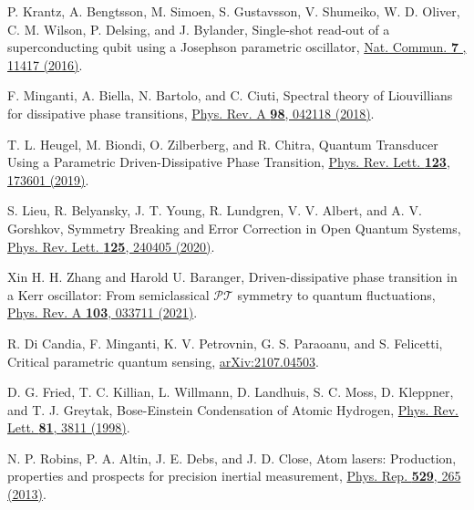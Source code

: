 \documentclass[twocolumn,prl,floatfix,citeautoscript,nofootinbib,superscriptaddress]{revtex4}
\begin{document}
\begin{widetext}
\begin{thebibliography}{99}
 P. Krantz, A. Bengtsson, M. Simoen, S. Gustavsson, V.
Shumeiko, W. D. Oliver, C. M. Wilson, P. Delsing, and J. Bylander,
Single-shot read-out of a superconducting qubit using a Josephson parametric
oscillator, \href{https://doi.org/10.1038/ncomms11417}{Nat. Commun. \textbf{7%
}, 11417 (2016)}.

 F. Minganti, A. Biella, N. Bartolo, and C.
Ciuti, Spectral theory of Liouvillians for dissipative phase transitions,
\href{https://doi.org/10.1103/PhysRevA.98.042118}{Phys. Rev. A \textbf{98},
042118 (2018)}.

 T. L. Heugel, M. Biondi, O. Zilberberg,
and R. Chitra, Quantum Transducer Using a Parametric Driven-Dissipative
Phase Transition, \href{https://doi.org/10.1103/PhysRevLett.123.173601}{%
Phys. Rev. Lett. \textbf{123}, 173601 (2019)}.

 S. Lieu, R. Belyansky, J. T. Young, R.
Lundgren, V. V. Albert, and A. V. Gorshkov, Symmetry Breaking and Error
Correction in Open Quantum Systems, \href{https://doi.org/10.1103/PhysRevLett.125.240405}%
{Phys. Rev. Lett. \textbf{125}, 240405 (2020)}.

 Xin H. H. Zhang and Harold U. Baranger,
Driven-dissipative phase transition in a Kerr oscillator: From semiclassical
$\mathcal{PT}$ symmetry to quantum fluctuations, \href{https://doi.org/10.1103/PhysRevA.103.033711}%
{Phys. Rev. A \textbf{103}, 033711 (2021)}.

 R. Di Candia, F. Minganti, K. V. Petrovnin, G.
S. Paraoanu, and S. Felicetti, Critical parametric quantum sensing, \href{https://doi.org/10.48550/arXiv.2107.04503}%
{arXiv:2107.04503}.

 D. G. Fried, T. C. Killian, L. Willmann, D.
Landhuis, S. C. Moss, D. Kleppner, and T. J. Greytak, Bose-Einstein
Condensation of Atomic Hydrogen, \href{https://doi.org/10.1103/PhysRevLett.81.3811}%
{Phys. Rev. Lett. \textbf{81}, 3811 (1998)}.

 N. P. Robins, P. A. Altin, J. E. Debs, and J. D.
Close, Atom lasers: Production, properties and prospects for precision
inertial measurement, \href{https://doi.org/10.1016/j.physrep.2013.03.006}{%
Phys. Rep. \textbf{529}, 265 (2013)}.
\end{thebibliography}


\end{widetext}
\end{document}
